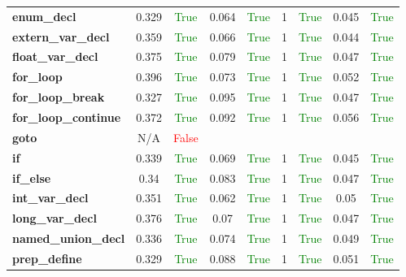 \documentclass{article}
\begin{document}
\begin{xltabular}{\textwidth}{lcccccccc}
\textbf{{\fontsize{10}{12}\selectfont enum\_decl}}& 0.329&\textcolor{green}{True}& 0.064&\textcolor{green}{True}& 1&\textcolor{green}{True}& 0.045&\textcolor{green}{True} \\[0.5ex]
\textbf{{\fontsize{10}{12}\selectfont extern\_var\_decl}}& 0.359&\textcolor{green}{True}& 0.066&\textcolor{green}{True}& 1&\textcolor{green}{True}& 0.044&\textcolor{green}{True} \\[0.5ex]
\textbf{{\fontsize{10}{12}\selectfont float\_var\_decl}}& 0.375&\textcolor{green}{True}& 0.079&\textcolor{green}{True}& 1&\textcolor{green}{True}& 0.047&\textcolor{green}{True} \\[0.5ex]
\textbf{{\fontsize{10}{12}\selectfont for\_loop}}& 0.396&\textcolor{green}{True}& 0.073&\textcolor{green}{True}& 1&\textcolor{green}{True}& 0.052&\textcolor{green}{True} \\[0.5ex]
\textbf{{\fontsize{10}{12}\selectfont for\_loop\_break}}& 0.327&\textcolor{green}{True}& 0.095&\textcolor{green}{True}& 1&\textcolor{green}{True}& 0.047&\textcolor{green}{True} \\[0.5ex]
\textbf{{\fontsize{10}{12}\selectfont for\_loop\_continue}}& 0.372&\textcolor{green}{True}& 0.092&\textcolor{green}{True}& 1&\textcolor{green}{True}& 0.056&\textcolor{green}{True} \\[0.5ex]
\textbf{{\fontsize{10}{12}\selectfont goto}}& N/A&\textcolor{red}{False} \\[0.5ex]
\textbf{{\fontsize{10}{12}\selectfont if}}& 0.339&\textcolor{green}{True}& 0.069&\textcolor{green}{True}& 1&\textcolor{green}{True}& 0.045&\textcolor{green}{True} \\[0.5ex]
\textbf{{\fontsize{10}{12}\selectfont if\_else}}& 0.34&\textcolor{green}{True}& 0.083&\textcolor{green}{True}& 1&\textcolor{green}{True}& 0.047&\textcolor{green}{True} \\[0.5ex]
\textbf{{\fontsize{10}{12}\selectfont int\_var\_decl}}& 0.351&\textcolor{green}{True}& 0.062&\textcolor{green}{True}& 1&\textcolor{green}{True}& 0.05&\textcolor{green}{True} \\[0.5ex]
\textbf{{\fontsize{10}{12}\selectfont long\_var\_decl}}& 0.376&\textcolor{green}{True}& 0.07&\textcolor{green}{True}& 1&\textcolor{green}{True}& 0.047&\textcolor{green}{True} \\[0.5ex]
\textbf{{\fontsize{10}{12}\selectfont named\_union\_decl}}& 0.336&\textcolor{green}{True}& 0.074&\textcolor{green}{True}& 1&\textcolor{green}{True}& 0.049&\textcolor{green}{True} \\[0.5ex]
\textbf{{\fontsize{10}{12}\selectfont prep\_define}}& 0.329&\textcolor{green}{True}& 0.088&\textcolor{green}{True}& 1&\textcolor{green}{True}& 0.051&\textcolor{green}{True} \\[0.5ex]

\end{xltabular}
\end{document}

